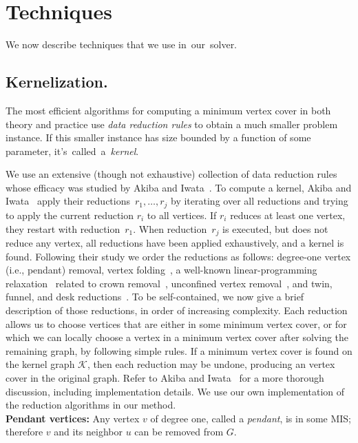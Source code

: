 \documentclass[twoside,leqno,twocolumn]{article}
\begin{document}
\section{Techniques}
\label{sec:techniques}
We now describe techniques that we use in~our~solver.
\subsection{Kernelization.}
The most efficient algorithms for computing a minimum vertex cover in both theory and practice use \emph{data reduction rules} to obtain a much smaller problem instance. If this smaller instance has size bounded by a function of some parameter, it's~called~a~\emph{kernel}. 

We use an extensive (though not exhaustive) collection of data reduction rules whose efficacy was studied by Akiba and Iwata~\cite{akiba-tcs-2016}. To compute a kernel, Akiba and Iwata~\cite{akiba-tcs-2016} apply their
reductions~$r_1, \dots, r_j$ by iterating over all reductions and trying to
apply the current reduction $r_i$ to all vertices. If $r_i$ reduces at
least one vertex, they restart with reduction~$r_1$. When reduction~$r_j$ 
is executed, but does not reduce any vertex, all reductions have been applied
exhaustively, and a kernel is found. Following their study we order the reductions
as follows: degree-one vertex (i.e., pendant) removal, vertex folding~\cite{chen-1999}, a well-known linear-programming 
relaxation~\cite{iwata-2014,nemhauser-1975} related to crown removal~\cite{abu-khzam-2007}, unconfined vertex removal~\cite{Xiao201392}, and twin, funnel, and desk reductions~\cite{Xiao201392}.
To be self-contained, we now give a brief description of those reductions, in order of increasing complexity. Each reduction allows us to choose vertices that are either in some minimum vertex cover, or for which we can locally choose a vertex in a minimum vertex cover after solving the remaining graph, by following simple rules. If a minimum vertex cover  is found on the kernel graph $\mathcal{K}$, then each reduction may be undone, producing an vertex cover in the original graph. Refer to Akiba and Iwata~\cite{akiba-tcs-2016} for a more thorough discussion, including implementation details. We use our own implementation of the reduction algorithms in our method. \\

\noindent\textbf{Pendant vertices:} Any vertex $v$ of degree one, called a \emph{pendant}, is in some MIS; therefore $v$ and its neighbor $u$ can be removed from $G$. \\
\end{document}
